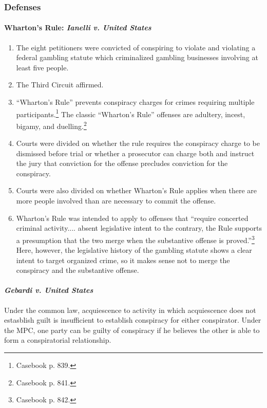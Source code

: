 \subsubsection{Defenses}

\paragraph{Wharton's Rule: \emph{Ianelli v. United States}}

\begin{enumerate}
    \item The eight petitioners were convicted of conspiring to violate and 
    violating a federal gambling statute which criminalized gambling 
    businesses involving at least five people.
    \item The Third Circuit affirmed.
    \item ``Wharton's Rule'' prevents conspiracy charges for crimes requiring 
    multiple participants.\footnote{Casebook p. 839.} The classic ``Wharton's 
    Rule'' offenses are adultery, incest, bigamy, and 
    duelling.\footnote{Casebook p. 841.}
    \item Courts were divided on whether the rule requires the conspiracy 
    charge to be dismissed before trial or whether a prosecutor can charge 
    both and instruct the jury that conviction for the offense precludes 
    conviction for the conspiracy.
    \item Courts were also divided on whether Wharton's Rule applies when 
    there are more people involved than are necessary to commit the offense.
    \item Wharton's Rule was intended to apply to offenses that ``require 
    concerted criminal activity.... absent legislative intent to the contrary, 
    the Rule supports a presumption that the two merge when the substantive 
    offense is proved.''\footnote{Casebook p. 842.} Here, however, the legislative 
    history of the gambling statute shows a clear intent to target organized crime, so it makes sense 
    not to merge the conspiracy and the substantive offense.
\end{enumerate}

\paragraph{\emph{Gebardi v. United States}}

Under the common law, acquiescence to activity in which acquiescence does not 
estasblish guilt is insufficient to establish conspiracy for either 
conspirator. Under the MPC, one party can be guilty of conspiracy if he 
believes the other is able to form a conspiratorial relationship.

